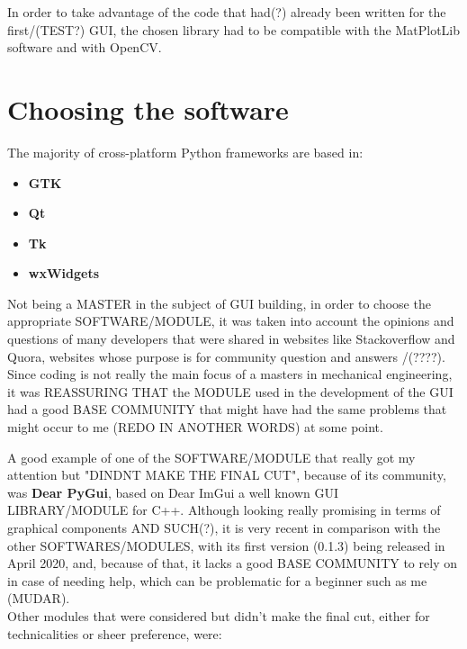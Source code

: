 In order to take advantage of the code that had(?) already been written for the first/(TEST?) GUI, the chosen library had to be compatible with the MatPlotLib software and with OpenCV.

\section{Choosing the software} %
\label{sub:choosing_the_software}

The majority of cross-platform Python frameworks are based in:

\begin{itemize}
  
  \item \textbf{GTK}
  \item \textbf{Qt}
  \item \textbf{Tk}
  \item \textbf{wxWidgets}
  
\end{itemize}


Not being a MASTER in the subject of GUI building, in order to choose the appropriate SOFTWARE/MODULE, it was taken into account the opinions and questions of many developers that were shared in websites like Stackoverflow and Quora, websites whose purpose is for community question and answers /(????). Since coding is not really the main focus of a masters in mechanical engineering, it was REASSURING THAT the MODULE used in the development of the GUI had a good  BASE COMMUNITY that might have had the same problems that might occur to me (REDO IN ANOTHER WORDS) at some point. 

A good example of one of the SOFTWARE/MODULE that really got my attention but "DINDNT MAKE THE FINAL CUT", because of its community, was \textbf{Dear PyGui}, based on Dear ImGui a well known GUI LIBRARY/MODULE for C++. Although looking really promising in terms of graphical components AND SUCH(?), it is very recent in comparison with the other SOFTWARES/MODULES, with its first version (0.1.3) being released in April 2020, and, because of that, it lacks a good BASE COMMUNITY to rely on in case of needing help, which can be problematic for a beginner such as me (MUDAR). \\

Other modules that were considered but didn't make the final cut, either for technicalities or sheer preference, were:

